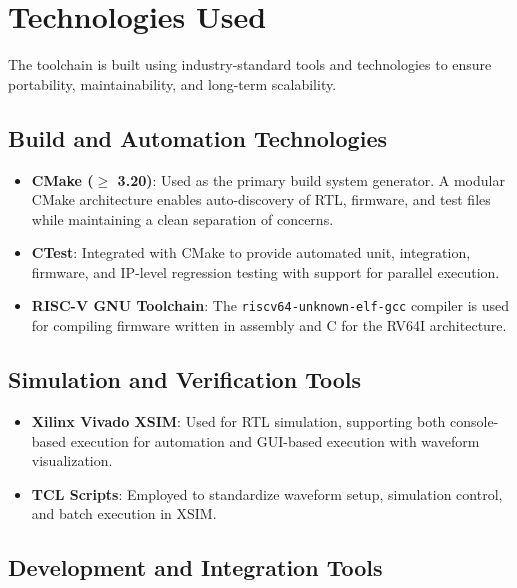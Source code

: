 \section{Technologies Used}

The toolchain is built using industry-standard tools and technologies to ensure portability, maintainability, and long-term scalability.

\subsection{Build and Automation Technologies}

\begin{itemize}
    \item \textbf{CMake ($\geq$ 3.20)}:  
    Used as the primary build system generator. A modular CMake architecture enables auto-discovery of RTL, firmware, and test files while maintaining a clean separation of concerns.
    
    \item \textbf{CTest}:  
    Integrated with CMake to provide automated unit, integration, firmware, and IP-level regression testing with support for parallel execution.
    
    \item \textbf{RISC-V GNU Toolchain}:  
    The \texttt{riscv64-unknown-elf-gcc} compiler is used for compiling firmware written in assembly and C for the RV64I architecture.
\end{itemize}

\subsection{Simulation and Verification Tools}

\begin{itemize}
    \item \textbf{Xilinx Vivado XSIM}:  
    Used for RTL simulation, supporting both console-based execution for automation and GUI-based execution with waveform visualization.
    
    \item \textbf{TCL Scripts}:  
    Employed to standardize waveform setup, simulation control, and batch execution in XSIM.
\end{itemize}

\subsection{Development and Integration Tools}

